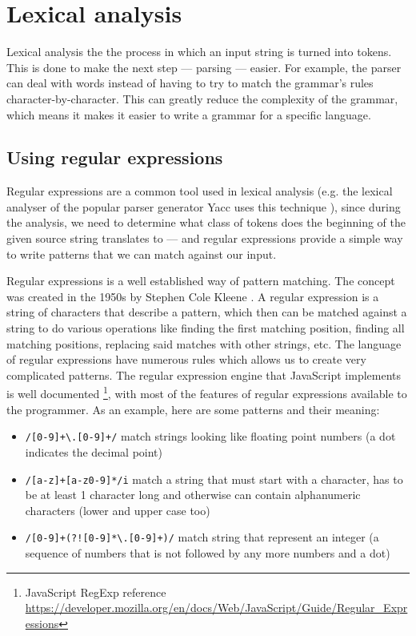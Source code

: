 \chapter{Lexical analysis}\label{sect:Lexing}
Lexical analysis the the process in which an input string is turned into tokens. This is done to make the next step --- parsing --- easier. For example, the parser can deal with words instead of having to try to match the grammar's rules character-by-character. This can greatly reduce the complexity of the grammar, which means it makes it easier to write a grammar for a specific language.
\section{Using regular expressions}
Regular expressions are a common tool used in lexical analysis (e.g. the lexical analyser of the popular parser generator Yacc uses this technique \cite{Lex}), since during the analysis, we need to determine what class of tokens does the beginning of the given source string translates to --- and regular expressions provide a simple way to write patterns that we can match against our input.

Regular expressions is a well established way of pattern matching. The concept was created in the 1950s by Stephen Cole Kleene \cite{kleene1951representation}. A regular expression is a string of characters that describe a pattern, which then can be matched against a string to do various operations like finding the first matching position, finding all matching positions, replacing said matches with other strings, etc. The language of regular expressions have numerous rules which allows us to create very complicated patterns. The regular expression engine that JavaScript implements is well documented \footnote{JavaScript RegExp reference \url{https://developer.mozilla.org/en/docs/Web/JavaScript/Guide/Regular_Expressions}}, with most of the features of regular expressions available to the programmer. As an example, here are some patterns and their meaning:
\begin{itemize}
\item \texttt{/[0-9]+\textbackslash.[0-9]+/} match strings looking like floating point numbers (a dot indicates the decimal point)
\item \texttt{/[a-z]+[a-z0-9]*/i} match a string that must start with a character, has to be at least 1 character long and otherwise can contain alphanumeric characters (lower and upper case too)
\item \texttt{/[0-9]+(?![0-9]*\textbackslash.[0-9]+)/} match string that represent an integer (a sequence of numbers that is not followed by any more numbers and a dot)
\end{itemize}

